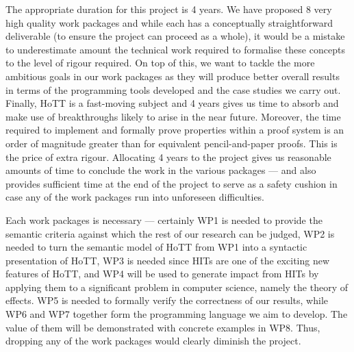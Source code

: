 \documentclass[a4paper,11pt]{article}
\begin{document}
\vspace{0.02in}

 The appropriate duration for
this project is 4 years. We have proposed 8 very high quality work
packages and while each has a conceptually straightforward deliverable
(to ensure the project can proceed as a whole), it would be a mistake
to underestimate amount the technical work required to formalise these
concepts to the level of rigour required. On top of this,
we want to tackle the more ambitious goals in our work packages as
they will produce better overall results in terms of the programming
tools developed and the case studies we carry out. Finally,
HoTT is a fast-moving subject and 4 years gives us time to absorb and
make use of breakthroughs likely to arise in the near future.
Moreover, the time required to implement and formally prove properties
within a proof system is an order of magnitude greater than for
equivalent pencil-and-paper proofs. This is the price of extra
rigour. Allocating 4 years to the project gives us reasonable amounts
of time to conclude the work in the various packages
--- and also
provides sufficient time at the end of the project to serve as a
safety cushion in case any of the work packages run into unforeseen
difficulties.

\noindent Each work packages is necessary --- certainly WP1 is needed
to provide the semantic criteria against which the 
rest of our research can be judged, WP2 is needed to turn the semantic
model of HoTT from WP1 into a syntactic presentation of HoTT, WP3 is
needed since HITs are one of the exciting new features of HoTT, and
WP4 will be used to generate impact from HITs by applying them to a
significant problem in computer science, namely the theory of
effects. WP5 is needed to formally verify the correctness of our results, while WP6 and WP7 together form the programming language
we aim to develop. The value of them will be demonstrated with
concrete examples in WP8.  Thus, dropping any of the work packages
would clearly diminish the project.

\vspace{0.02in}
\end{document}
